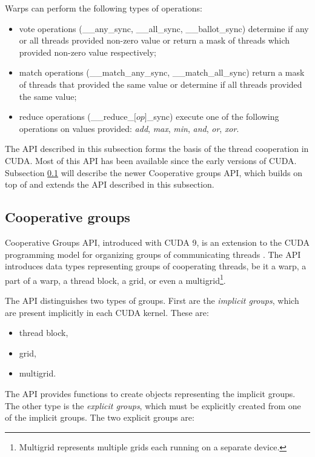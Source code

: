Warps can perform the following types of operations:
\begin{itemize}
	\item vote operations (\_\_any\_sync, \_\_all\_sync, \_\_ballot\_sync) determine if any or all threads provided non-zero value or return a mask of threads which provided non-zero value respectively;
	\item match operations (\_\_match\_any\_sync, \_\_match\_all\_sync) return a mask of threads that provided the same value or determine if all threads provided the same value;
	\item reduce operations (\_\_reduce\_$\lbrack op \rbrack$\_sync) execute one of the following operations on values provided: \textit{add}, \textit{max}, \textit{min}, \textit{and}, \textit{or}, \textit{xor}.
\end{itemize}


The API described in this subsection forms the basis of the thread cooperation in CUDA. Most of this API has been available since the early versions of CUDA. Subsection \ref{sec:cooperative_groups} will describe the newer Cooperative groups API, which builds on top of and extends the API described in this subsection.

\subsection{Cooperative groups}
\label{sec:cooperative_groups}

Cooperative Groups API, introduced with CUDA 9, is an extension to the CUDA programming model for organizing groups of communicating threads \citep{site:cuda}. The API introduces data types representing groups of cooperating threads, be it a warp, a part of a warp, a thread block, a grid, or even a multigrid\footnote{Multigrid represents multiple grids each running on a separate device.}.


The API distinguishes two types of groups. First are the \textit{implicit groups}, which are present implicitly in each CUDA kernel. These are:

\begin{itemize}
	\item thread block,
	\item grid,
	\item multigrid.
\end{itemize}

The API provides functions to create objects representing the implicit groups. 
The other type is the \textit{explicit groups}, which must be explicitly created from one of the implicit groups. The two explicit groups are:

